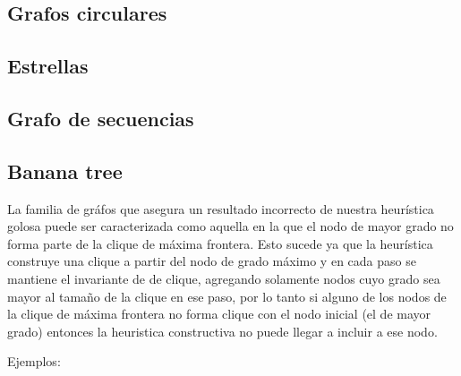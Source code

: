 \subsection{Grafos circulares}

\subsection{Estrellas}

\subsection{Grafo de secuencias}

\subsection{Banana tree}
	




La familia de gr\'afos que asegura un resultado incorrecto de nuestra 
heur\'istica golosa puede ser caracterizada como aquella en la que el
nodo de mayor grado no forma parte de la clique de m\'axima frontera.
Esto sucede ya que la heur\'istica construye una clique a partir del 
nodo de grado m\'aximo y en cada paso se mantiene el invariante de 
de clique, agregando solamente nodos cuyo grado sea mayor al tama\~no
de la clique en ese paso, por lo tanto si alguno de los nodos de la 
clique de m\'axima frontera no forma clique con el nodo 
inicial (el de mayor grado) entonces la heuristica constructiva no 
puede llegar a incluir a ese nodo.

Ejemplos:

%
%
%
	
